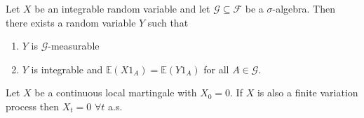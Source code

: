 \documentclass[hidelinks, 12pt]{article}
\theoremstyle{mydefstyle}
\theoremstyle{mythmstyle}
\begin{document}
Let $X$ be an integrable random variable and let $\mathcal{G} \subseteq \mathcal{F}$ be a $\sigma$-algebra. Then there exists a random variable $Y$ such that
\begin{enumerate}[label=(\alph*)]
\item $Y$ is $\mathcal{G}$-measurable
\item $Y$ is integrable and $\mathbb{E}(X1_A) = \mathbb{E}(Y1_A)$ for all $A \in \mathcal{G}$. 
\end{enumerate}

Let $X$ be a continuous local martingale with $X_0 = 0$. If $X$ is also a finite variation process then $X_t = 0$ $\forall t$ a.s.
\end{document}
